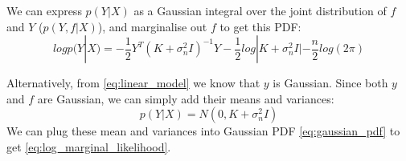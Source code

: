 \documentclass[10pt]{article}
\begin{document}
We can express $p(Y|X)$ as a Gaussian integral over the joint distribution of $f$ and $Y$ ($p(Y,f|X)$), and marginalise out $f$ to get this PDF:
\begin{equation} \label{eq:log_marginal_likelihood}
    log p(Y|X) = -\frac{1}{2}Y^T(K + \sigma^2_nI)^{-1}Y - \frac{1}{2}log|K + \sigma^2_nI| - \frac{n}{2}log(2\pi)
\end{equation}

Alternatively, from \ref{eq:linear_model} we know that $y$ is Gaussian. Since both $y$ and $f$ are Gaussian, we can simply add their means and variances: 
\begin{equation*}
    p(Y|X) = N(0, K + \sigma^2_nI)
\end{equation*}
We can plug these mean and variances into Gaussian PDF \ref{eq:gaussian_pdf} to get \ref{eq:log_marginal_likelihood}.
\end{document}
